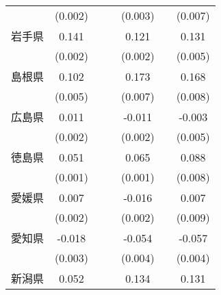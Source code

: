 \begin{table}[htbp]
\begin{tabular}{l*{6}{c}}
                    &     (0.002)         &                     &                     &     (0.003)         &                     &     (0.007)         \\
岩手県              &       0.141\sym{***}&                     &                     &       0.121\sym{***}&                     &       0.131\sym{***}\\
                    &     (0.002)         &                     &                     &     (0.002)         &                     &     (0.005)         \\
島根県              &       0.102\sym{***}&                     &                     &       0.173\sym{***}&                     &       0.168\sym{***}\\
                    &     (0.005)         &                     &                     &     (0.007)         &                     &     (0.008)         \\
広島県              &       0.011\sym{***}&                     &                     &      -0.011\sym{***}&                     &      -0.003         \\
                    &     (0.002)         &                     &                     &     (0.002)         &                     &     (0.005)         \\
徳島県              &       0.051\sym{***}&                     &                     &       0.065\sym{***}&                     &       0.088\sym{***}\\
                    &     (0.001)         &                     &                     &     (0.001)         &                     &     (0.008)         \\
愛媛県              &       0.007\sym{***}&                     &                     &      -0.016\sym{***}&                     &       0.007         \\
                    &     (0.002)         &                     &                     &     (0.002)         &                     &     (0.009)         \\
愛知県              &      -0.018\sym{***}&                     &                     &      -0.054\sym{***}&                     &      -0.057\sym{***}\\
                    &     (0.003)         &                     &                     &     (0.004)         &                     &     (0.004)         \\
新潟県              &       0.052\sym{***}&                     &                     &       0.134\sym{***}&                     &       0.131\sym{***}\\

\end{tabular}
\end{table}
